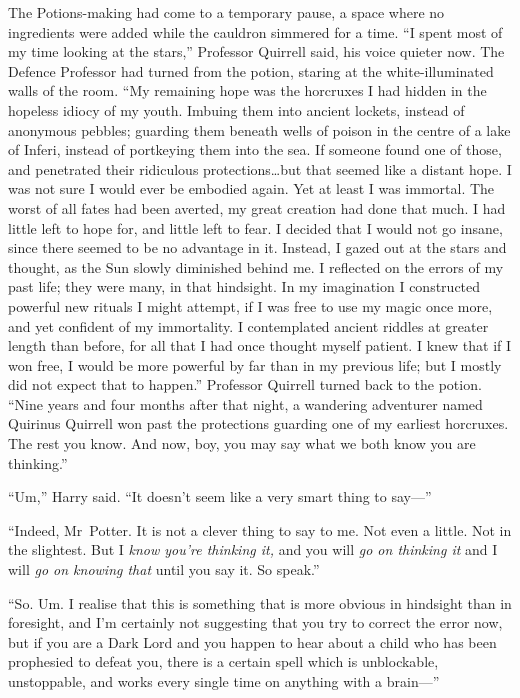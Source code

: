The Potions-making had come to a temporary pause, a space where no ingredients
were added while the cauldron simmered for a time. “I spent most of my time
looking at the stars,” Professor Quirrell said, his voice quieter now. The
Defence Professor had turned from the potion, staring at the white-illuminated
walls of the room. “My remaining hope was the horcruxes I had hidden in the
hopeless idiocy of my youth. Imbuing them into ancient lockets, instead of
anonymous pebbles; guarding them beneath wells of poison in the centre of a
lake of Inferi, instead of portkeying them into the sea. If someone found one
of those, and penetrated their ridiculous protections…but that seemed
like a distant hope. I was not sure I would ever be embodied again. Yet at
least I was immortal. The worst of all fates had been averted, my great
creation had done that much. I had little left to hope for, and little left to
fear. I decided that I would not go insane, since there seemed to be no
advantage in it. Instead, I gazed out at the stars and thought, as the Sun
slowly diminished behind me. I reflected on the errors of my past life; they
were many, in that hindsight. In my imagination I constructed powerful new
rituals I might attempt, if I was free to use my magic once more, and yet
confident of my immortality. I contemplated ancient riddles at greater length
than before, for all that I had once thought myself patient. I knew that if I
won free, I would be more powerful by far than in my previous life; but I
mostly did not expect that to happen.” Professor Quirrell turned back to the
potion. “Nine years and four months after that night, a wandering adventurer
named Quirinus Quirrell won past the protections guarding one of my earliest
horcruxes. The rest you know. And now, boy, you may say what we both know you
are thinking.”

“Um,” Harry said. “It doesn’t seem like a very smart thing to say—”

“Indeed, Mr~Potter. It is not a clever thing to say to me. Not even a little.
Not in the slightest. But I \emph{know you’re thinking it,} and you will
\emph{go on thinking it} and I will \emph{go on knowing that} until you say it.
So speak.”

“So. Um. I realise that this is something that is more obvious in hindsight
than in foresight, and I’m certainly not suggesting that you try to correct the
error now, but if you are a Dark Lord and you happen to hear about a child who
has been prophesied to defeat you, there is a certain spell which is
unblockable, unstoppable, and works every single time on anything with a
brain—”

